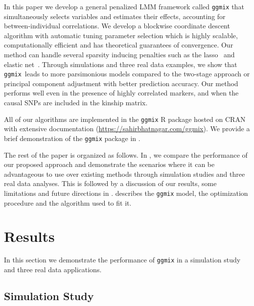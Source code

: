 \documentclass[10pt,letterpaper]{article}
\newcommand{\ggmix}{\texttt{ggmix}}
\begin{document}
In this paper we develop a general penalized LMM framework called \texttt{ggmix} that simultaneously selects variables and estimates their effects, accounting for between-individual correlations. We develop a blockwise coordinate descent algorithm with automatic tuning parameter selection which is highly scalable, computationally efficient and has theoretical guarantees of convergence. Our method can handle several sparsity inducing penalties such as the lasso~\cite{tibshirani1996regression} and elastic net~\cite{zou2005regularization}. Through simulations and three real data examples, we show that \ggmix ~leads to more parsimonious models compared to the two-stage approach or principal component adjustment with better prediction accuracy. Our method performs well even in the presence of highly correlated markers, and when the causal SNPs are included in the kinship matrix. 

All of our algorithms are implemented in the \texttt{ggmix} R package hosted on CRAN with extensive documentation (\url{https://sahirbhatnagar.com/ggmix}). We provide a brief demonstration of the \texttt{ggmix} package in .

The rest of the paper is organized as follows. In , we compare the performance of our proposed approach and demonstrate the scenarios where it can be advantageous to use over existing methods through simulation studies and three real data analyses. This is followed by a discussion of our results, some limitations and future directions in .  describes the \texttt{ggmix} model, the optimization procedure and the algorithm used to fit it.




\section*{Results}\label{sec:results}

In this section we demonstrate the performance of \texttt{ggmix} in a simulation study and three real data applications. 

\subsection*{Simulation Study} \label{simustudy}
\end{document}
